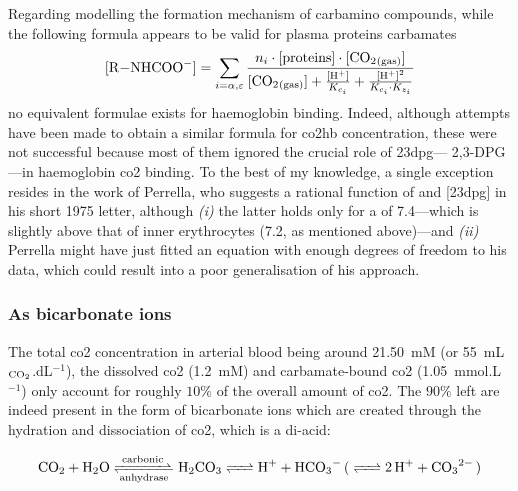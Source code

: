 Regarding modelling the formation mechanism of carbamino compounds, while the following formula appears to be valid for plasma proteins carbamates\cite{klocke1987}
\begin{equation}
	\ce{[R-NHCOO^-]} = \sum_{i=\alpha, \varepsilon} \frac{n_i \cdot [\text{proteins}] \cdot \ce{[CO2_{(gas)}]}}{\ce{[CO2_{(gas)}]} + \frac{\ce{[H+]}}{K_{c_i}} + \frac{\ce{[H+]}^2}{K_{c_i} \cdot K_{z_i}} }
\end{equation}
no equivalent formulae exists for haemoglobin binding. Indeed, although attempts have been made to obtain a similar formula for \gls{co2hb} concentration, these were not successful because most of them ignored the crucial role of \gls{23dpg}---\aka{} 2,3-DPG---in haemoglobin \gls{co2} binding\cite{gros1981, klocke1987}. To the best of my knowledge, a single exception resides in the work of Perrella,  who suggests a rational function of \ce{[CO2_{(gas)}]} and [\gls{23dpg}] in his short 1975 letter\cite{perrella1975a}, although \emph{(i)} the latter holds only for a \pH{} of 7.4---which is slightly above that of inner erythrocytes (7.2, as mentioned above)---and \emph{(ii)} Perrella might have just fitted an equation with enough degrees of freedom to his data, which could result into a poor generalisation of his approach.

\subsubsection{As bicarbonate ions}\label{subsect:co2hb:bicarb}

The total \gls{co2} concentration in arterial blood being around 21.50~mM (or 55~mL$_{\ce{CO_2}}$.dL$^{-1}$), the dissolved \gls{co2} (1.2~mM) and carbamate-bound \gls{co2} (1.05~mmol.L$^{-1}$) only account for roughly $10\%$ of the overall amount of \gls{co2}\cite{geers2000}. The $90\%$ left are indeed present in the form of bicarbonate ions which are created through the hydration and dissociation of \gls{co2}, which is a di-acid:

\begin{equation}\label{eq:co2hb:carb_disso}
	\ce{CO2 + H2O <=>T[carbonic][anhydrase] H2CO3 <=> H+ + HCO3- ( <=> 2H+ + CO3^2- )}
\end{equation}

